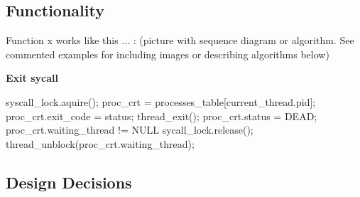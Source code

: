     \subsection{Functionality}

	Function x works like this ... : (picture with sequence diagram or algorithm. See commented examples for including images or describing algorithms below)

	\textbf{Exit sycall}
	  \begin{program}
	    syscall\_lock.aquire();
	    proc\_crt = processes\_table[current\_thread.pid];
	    proc\_crt.exit\_code = status;
	    thread\_exit();
	    proc\_crt.status = DEAD;
	    \IF proc\_crt.waiting\_thread != NULL 
	      \THEN sycall\_lock.release(); 
	      thread\_unblock(proc\_crt.waiting_thread); 
	    \FI
	  \end{program}






    \subsection{Design Decisions}

